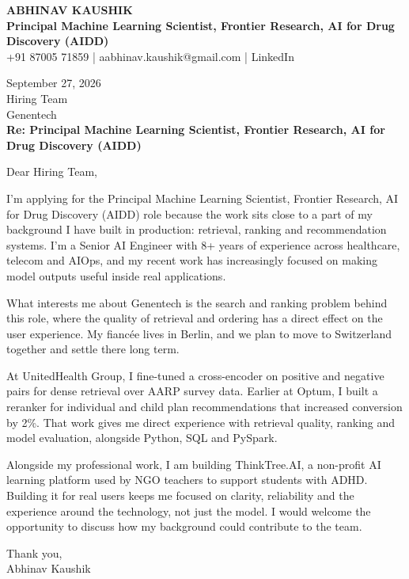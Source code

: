 \documentclass[10pt,a4paper]{article}
\begin{document}
\begin{center}
{\Large\bfseries ABHINAV KAUSHIK}\\[2pt]
{\bfseries Principal Machine Learning Scientist, Frontier Research, AI for Drug Discovery (AIDD)}\\[2pt]
+91 87005 71859 \quad | \quad aabhinav.kaushik@gmail.com \quad | \quad LinkedIn
\end{center}
\vspace{8pt}
September 27, 2026\\[6pt]
Hiring Team\\
Genentech\\[4pt]
\textbf{Re: Principal Machine Learning Scientist, Frontier Research, AI for Drug Discovery (AIDD)}

Dear Hiring Team,

I’m applying for the Principal Machine Learning Scientist, Frontier Research, AI for Drug Discovery (AIDD) role because the work sits close to a part of my background I have built in production: retrieval, ranking and recommendation systems. I’m a Senior AI Engineer with 8+ years of experience across healthcare, telecom and AIOps, and my recent work has increasingly focused on making model outputs useful inside real applications.

What interests me about Genentech is the search and ranking problem behind this role, where the quality of retrieval and ordering has a direct effect on the user experience. My fiancée lives in Berlin, and we plan to move to Switzerland together and settle there long term.

At UnitedHealth Group, I fine-tuned a cross-encoder on positive and negative pairs for dense retrieval over AARP survey data. Earlier at Optum, I built a reranker for individual and child plan recommendations that increased conversion by 2\%. That work gives me direct experience with retrieval quality, ranking and model evaluation, alongside Python, SQL and PySpark.

Alongside my professional work, I am building ThinkTree.AI, a non-profit AI learning platform used by NGO teachers to support students with ADHD. Building it for real users keeps me focused on clarity, reliability and the experience around the technology, not just the model. I would welcome the opportunity to discuss how my background could contribute to the team.

Thank you,\\
Abhinav Kaushik
\end{document}
